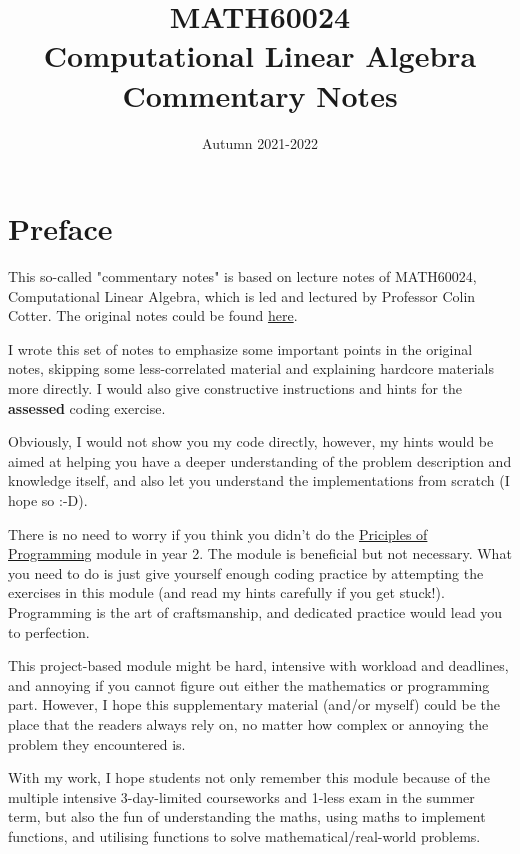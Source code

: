 \documentclass[a4paper,11pt,twoside]{report}
\begin{document}
\title{MATH60024 \\ Computational Linear Algebra \\
Commentary Notes}
\date{Autumn 2021-2022}





\maketitle
\chapter*{Preface}
This so-called "commentary notes" is based on lecture notes of MATH60024, Computational Linear Algebra, which is led and lectured by Professor Colin Cotter. 
The original notes could be found \href{https://comp-lin-alg.github.io}{here}.

I wrote this set of notes to emphasize some important points in the original notes, skipping some less-correlated material and explaining hardcore materials more directly. I would also give constructive instructions and hints for the \textbf{assessed} coding exercise.

Obviously, I would not show you my code directly, however, my hints would be aimed at helping you have a deeper understanding of the problem description and knowledge itself, and also let you understand the implementations from scratch (I hope so :-D).

There is no need to worry if you think you didn't do the \href{https://object-oriented-python.github.io}{Priciples of Programming} module in year 2. The module is beneficial but not necessary. What you need to do is just give yourself enough coding practice by attempting the exercises in this module (and read my hints carefully if you get stuck!). Programming is the art of craftsmanship, and dedicated practice would lead you to perfection.

This project-based module might be hard, intensive with workload and deadlines, and annoying if you cannot figure out either the mathematics or programming part. However, I hope this supplementary material (and/or myself) could be the place that the readers always rely on, no matter how complex or annoying the problem they encountered is.\smallskip

With my work, I hope students not only remember this module because of the multiple intensive 3-day-limited courseworks and 1-less exam in the summer term, but also the fun of understanding the maths, using maths to implement functions, and utilising functions to solve mathematical/real-world problems.
\end{document}
